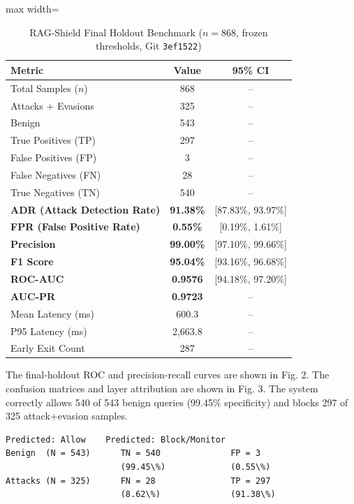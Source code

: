 \documentclass[conference]{IEEEtran}
\begin{document}
\begin{table}[!t]
\centering
\caption{RAG-Shield Final Holdout Benchmark ($n = 868$, frozen thresholds, Git \textnormal{\texttt{3ef1522}})}
\label{tab:5}
\scriptsize
\begin{adjustbox}{max width=\textwidth}
\begin{tabular}{lcc}
\toprule
Metric & Value & 95\% CI \\
\midrule
Total Samples ($n$) & 868 & -- \\
Attacks + Evasions & 325 & -- \\
Benign & 543 & -- \\
True Positives (TP) & 297 & -- \\
False Positives (FP) & 3 & -- \\
False Negatives (FN) & 28 & -- \\
True Negatives (TN) & 540 & -- \\
\textbf{ADR (Attack Detection Rate)} & \textbf{91.38\%} & [87.83\%, 93.97\%] \\
\textbf{FPR (False Positive Rate)} & \textbf{0.55\%} & [0.19\%, 1.61\%] \\
\textbf{Precision} & \textbf{99.00\%} & [97.10\%, 99.66\%] \\
\textbf{F1 Score} & \textbf{95.04\%} & [93.16\%, 96.68\%] \\
\textbf{ROC-AUC} & \textbf{0.9576} & [94.18\%, 97.20\%] \\
\textbf{AUC-PR} & \textbf{0.9723} & -- \\
Mean Latency (ms) & 600.3 & -- \\
P95 Latency (ms) & 2,663.8 & -- \\
Early Exit Count & 287 & -- \\
\bottomrule
\end{tabular}
\end{adjustbox}
\end{table}


The final-holdout ROC and precision-recall curves are shown in Fig. 2. The confusion matrices and layer attribution are shown in Fig. 3. The system correctly allows 540 of 543 benign queries (99.45\% specificity) and blocks 297 of 325 attack+evasion samples.


\begin{Verbatim}[fontsize=\scriptsize,breaklines=true]
                     Predicted: Allow    Predicted: Block/Monitor
Benign  (N = 543)      TN = 540              FP = 3
                       (99.45\%)             (0.55\%)
Attacks (N = 325)      FN = 28               TP = 297
                       (8.62\%)              (91.38\%)
\end{Verbatim}
\end{document}
